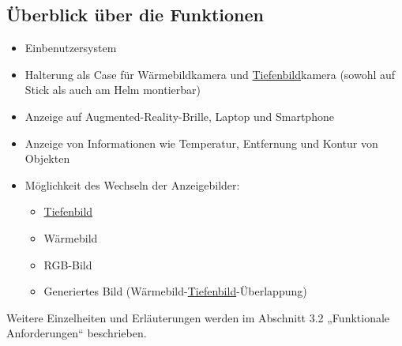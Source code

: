 \subsection{Überblick über die Funktionen}
\begin{itemize}
	\item Einbenutzersystem
	\item Halterung als Case für Wärmebildkamera und \hyperlink{tab:tiefe}{Tiefenbild}kamera (sowohl auf Stick als auch am Helm montierbar)
	\item Anzeige auf Augmented-Reality-Brille, Laptop und Smartphone
	\item Anzeige von Informationen wie Temperatur, Entfernung und Kontur von Objekten
	\item Möglichkeit des Wechseln der Anzeigebilder:
	\begin{itemize}
		\item \hyperlink{tab:tiefe}{Tiefenbild}
		\item Wärmebild
		\item RGB-Bild
		\item Generiertes Bild (Wärmebild-\hyperlink{tab:tiefe}{Tiefenbild}-Überlappung)
	\end{itemize}
\end{itemize}

Weitere Einzelheiten und Erläuterungen werden im Abschnitt 3.2 „Funktionale Anforderungen“ beschrieben.

